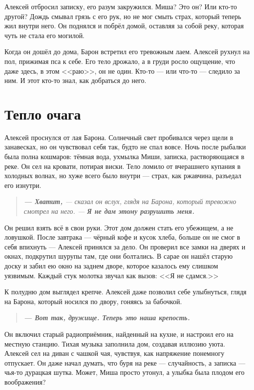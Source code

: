 \documentclass[12pt,a4paper]{book}
\newenvironment{dialogue}{\begin{quote}\itshape}{\end{quote}}
\begin{document}
Алексей отбросил записку, его разум закружился. Миша? Это он? Или кто-то другой? Дождь смывал грязь с его рук, но не мог смыть страх, который теперь жил внутри него. Он поднялся и побрёл домой, оставляя за собой реку, которая чуть не стала его могилой.

Когда он дошёл до дома, Барон встретил его тревожным лаем. Алексей рухнул на пол, прижимая пса к себе. Его тело дрожало, а в груди росло ощущение, что даже здесь, в этом <<раю>>, он не один. Кто-то --- или что-то --- следило за ним. И этот кто-то знал, как добраться до него.

\chapter{Тепло очага}

Алексей проснулся от лая Барона. Солнечный свет пробивался через щели в занавесках, но он чувствовал себя так, будто не спал вовсе. Ночь после рыбалки была полна кошмаров: тёмная вода, ухмылка Миши, записка, растворяющаяся в реке. Он сел на кровати, потирая виски. Тело ломило от вчерашнего купания в холодных волнах, но хуже всего было внутри --- страх, как ржавчина, разъедал его изнутри.

\begin{dialogue}
\textbf{--- Хватит,} --- сказал он вслух, глядя на Барона, который тревожно смотрел на него. --- \textbf{Я не дам этому разрушить меня.}
\end{dialogue}

Он решил взять всё в свои руки. Этот дом должен стать его убежищем, а не ловушкой. После завтрака --- чёрный кофе и кусок хлеба, больше он не смог в себя впихнуть --- Алексей принялся за дело. Он проверил все замки на дверях и окнах, подкрутил шурупы там, где они болтались. В сарае он нашёл старую доску и забил ею окно на заднем дворе, которое казалось ему слишком уязвимым. Каждый стук молотка звучал как вызов: <<Я не сдамся.>>

К полудню дом выглядел крепче. Алексей даже позволил себе улыбнуться, глядя на Барона, который носился по двору, гоняясь за бабочкой.

\begin{dialogue}
\textbf{--- Вот так, дружище. Теперь это наша крепость.}
\end{dialogue}

Он включил старый радиоприёмник, найденный на кухне, и настроил его на местную станцию. Тихая музыка заполнила дом, создавая иллюзию уюта. Алексей сел на диван с чашкой чая, чувствуя, как напряжение понемногу отпускает. Он даже начал думать, что буря на реке --- случайность, а записка --- чья-то дурацкая шутка. Может, Миша просто утонул, а улыбка была плодом его воображения?
\end{document}
